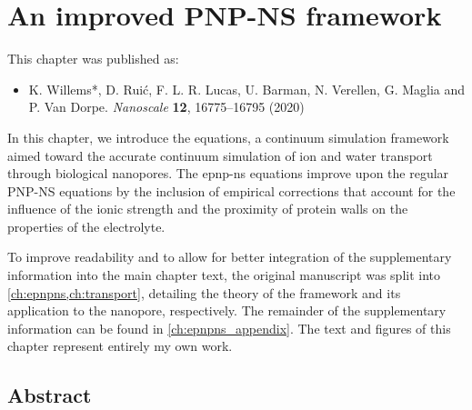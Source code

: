 \chapter{An improved PNP-NS framework}
%
\label{ch:epnpns}
%


%
%
\begin{shaded}
This chapter was published as:
%
\begin{itemize}
  \item K. Willems*, D. Rui\'{c}, F. L. R. Lucas, U. Barman, N. Verellen, G. Maglia and P. Van Dorpe.
        \textit{Nanoscale} \textbf{12}, 16775--16795 (2020) %
\end{itemize}
%
\newpage
\end{shaded}
%
%


In this chapter, we introduce the  equations, a continuum simulation framework aimed toward
the accurate continuum simulation of ion and water transport through biological nanopores. The \gls{epnp-ns}
equations improve upon the regular {PNP-NS} equations by the inclusion of empirical corrections that account for
the influence of the ionic strength and the proximity of protein walls on the properties of the electrolyte.
%

%
To improve readability and to allow for better integration of the supplementary information into the main
chapter text, the original manuscript was split into \cref{ch:epnpns,ch:transport}, detailing the theory of
the framework and its application to the  nanopore, respectively. The remainder of the
supplementary information can be found in \cref{ch:epnpns_appendix}. The text and figures of this chapter
represent entirely my own work.
%

%
%
%


\section{Abstract}
%
\label{sec:epnpns:abstract}
%

